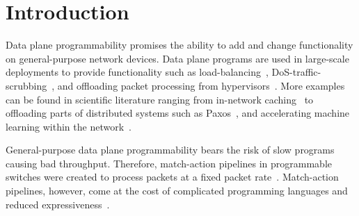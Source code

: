 \documentclass[sigconf,screen,authordraft]{acmart}
\newcommand{\mdata}[3]{%
	\csname #1X#2X#3\endcsname%
}
\begin{document}
\begin{abstract}
Programmable network devices are on the rise with many applications ranging from improved network management to accelerating and offloading parts of distributed systems.
Processor-based SmartNICs, match-action-based switches, and FPGA devices offer on-path programmability.
Whereas processor-based SmartNICs are much easier and more versatile to program, they have the huge disadvantage that the resulting throughput may vary strongly and is not easily predictable even to the programmer.
We want to close this gap by presenting a methodology which, given a SmartNIC program, determines the achievable throughput of this SmartNIC program in terms of achievable packet rate and bit rate.
Our approach combines incremental longest path search with \acs{SMT} checks to establish a lower bound for the slowest satisfiable program path.
By analyzing only the slowest program paths, our approach estimates throughput bounds within a few seconds.
The evaluation with our prototype on real programs shows that the estimated throughput guarantees are correct with an error of at most \mdata{rate.all}{rel.max.error.n}{.1} and provide a tight lower bound for processor- and memory-bottlenecked programs with only \mdata{rate.all}{rel.max.error.proc.p}{.1} and \mdata{rate.all}{rel.max.error.dram.p}{.1} underestimation.
\end{abstract}

\maketitle


\section{Introduction}

Data plane programmability promises the ability to add and change functionality on general-purpose network devices.
Data plane programs are used in large-scale deployments to provide functionality such as load-balancing~\cite{facebook-lb}, DoS-traffic-scrubbing~\cite{cloudflare}, and offloading packet processing from hypervisors~\cite{accelnet}.
More examples can be found in scientific literature ranging from in-network caching~\cite{netcache} to offloading parts of distributed systems such as Paxos~\cite{netpaxos}, and accelerating machine learning within the network~\cite{SwitchML,dumb-idea,ATP}.

General-purpose data plane programmability bears the risk of slow programs causing bad throughput.
Therefore, match-action pipelines in programmable switches were created to process packets at a fixed packet rate~\cite{RMT}.
Match-action pipelines, however, come at the cost of complicated programming languages and reduced expressiveness~\cite{p4-survey,p4-challenges}.
\end{document}
